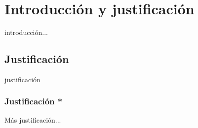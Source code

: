 \chapter{Introducción y justificación}

\bigskip
introducción...

\newpage
\section{Justificación}

\bigskip
justificación
\cite{nvidiadeveloper} 



\subsection{Justificación * }

\bigskip
Más justificación...






